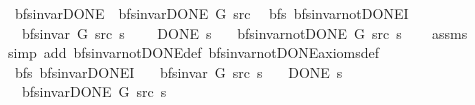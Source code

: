 \begin{isabellebody}
\ \ {\isachardoublequoteopen}bfs{\isacharunderscore}{\kern0pt}invar{\isacharunderscore}{\kern0pt}DONE{\isacharprime}{\kern0pt}{\isacharprime}{\kern0pt}\ {\isasymequiv}\ bfs{\isacharunderscore}{\kern0pt}invar{\isacharunderscore}{\kern0pt}DONE{\isacharprime}{\kern0pt}\ G\ src{\isachardoublequoteclose}%
\isadelimdocument
%
\endisadelimdocument
%
\isatagdocument
%
\isamarkuptrue%
%
\isamarkuptrue%
%
\endisatagdocument
{\isafolddocument}%
%
\isadelimdocument
%
\endisadelimdocument
{}\isamarkupfalse%
\ {\isacharparenleft}{\kern0pt}\ bfs{\isacharparenright}{\kern0pt}\ bfs{\isacharunderscore}{\kern0pt}invar{\isacharunderscore}{\kern0pt}not{\isacharunderscore}{\kern0pt}DONE{\isacharprime}{\kern0pt}I{\isacharcolon}{\kern0pt}\isanewline
\ \ \ {\isachardoublequoteopen}bfs{\isacharunderscore}{\kern0pt}invar{\isacharprime}{\kern0pt}\ G\ src\ s{\isachardoublequoteclose}\isanewline
\ \ \ {\isachardoublequoteopen}{\isasymnot}\ DONE\ s{\isachardoublequoteclose}\isanewline
\ \ \ {\isachardoublequoteopen}bfs{\isacharunderscore}{\kern0pt}invar{\isacharunderscore}{\kern0pt}not{\isacharunderscore}{\kern0pt}DONE{\isacharprime}{\kern0pt}\ G\ src\ s{\isachardoublequoteclose}\isanewline
%
\isadelimproof
\ \ %
\endisadelimproof
%
\isatagproof
{}\isamarkupfalse%
\ assms\isanewline
\ \ \isamarkupfalse%
\ {\isacharparenleft}{\kern0pt}simp\ add{\isacharcolon}{\kern0pt}\ bfs{\isacharunderscore}{\kern0pt}invar{\isacharunderscore}{\kern0pt}not{\isacharunderscore}{\kern0pt}DONE{\isacharunderscore}{\kern0pt}def\ bfs{\isacharunderscore}{\kern0pt}invar{\isacharunderscore}{\kern0pt}not{\isacharunderscore}{\kern0pt}DONE{\isacharunderscore}{\kern0pt}axioms{\isacharunderscore}{\kern0pt}def{\isacharparenright}{\kern0pt}%
\endisatagproof
{\isafoldproof}%
%
\isadelimproof
\isanewline
%
\endisadelimproof
\isanewline
{}\isamarkupfalse%
\ {\isacharparenleft}{\kern0pt}\ bfs{\isacharparenright}{\kern0pt}\ bfs{\isacharunderscore}{\kern0pt}invar{\isacharunderscore}{\kern0pt}DONE{\isacharprime}{\kern0pt}I{\isacharcolon}{\kern0pt}\isanewline
\ \ \ {\isachardoublequoteopen}bfs{\isacharunderscore}{\kern0pt}invar{\isacharprime}{\kern0pt}\ G\ src\ s{\isachardoublequoteclose}\isanewline
\ \ \ {\isachardoublequoteopen}DONE\ s{\isachardoublequoteclose}\isanewline
\ \ \ {\isachardoublequoteopen}bfs{\isacharunderscore}{\kern0pt}invar{\isacharunderscore}{\kern0pt}DONE{\isacharprime}{\kern0pt}\ G\ src\ s{\isachardoublequoteclose}\isanewline

\end{isabellebody}
